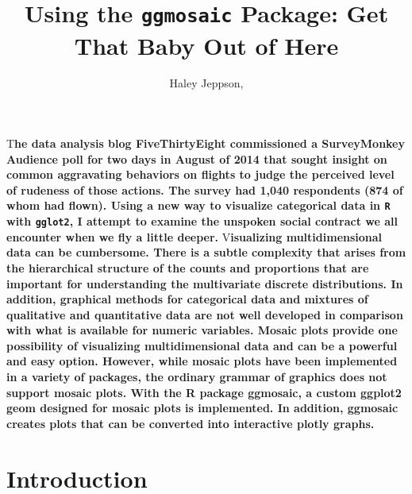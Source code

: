 \documentclass[DIV=calc, paper=a4, fontsize=10pt, twocolumn]{scrartcl}	 %
\title{Using the \texttt{ggmosaic} Package: Get That Baby Out of Here} %
\author{Haley Jeppson, } %
\date{} %
\newcommand{\initial}[1]{ %
\lettrine[lines=3,lhang=0.3,nindent=0em]{
\color{black}
{\textsf{#1}}}{}}
\begin{document}


\maketitle %

\thispagestyle{fancy} %


\vspace{-1cm}
\initial{T}\textbf{he data analysis blog FiveThirtyEight commissioned a SurveyMonkey Audience poll for two days in August of 2014 that sought insight on common aggravating behaviors on flights to judge the perceived level of rudeness of those actions. The survey had 1,040 respondents (874 of whom had flown). Using a new way to visualize categorical data in \texttt{R} with \texttt{gglot2}, I attempt to examine the unspoken social contract we all encounter when we fly a little deeper.}
\initial{V}\textbf{isualizing multidimensional data can be cumbersome. There is a subtle complexity that arises from the hierarchical structure of the counts and proportions that are important for understanding the multivariate discrete distributions. In addition, graphical methods for categorical data and mixtures of qualitative and quantitative data are not well developed in comparison with what is available for numeric variables. Mosaic plots provide one possibility of visualizing multidimensional data and can be a powerful and easy option. However, while mosaic plots have been implemented in a variety of packages, the ordinary grammar of graphics does not support mosaic plots. With the R package ggmosaic, a custom ggplot2 geom designed for mosaic plots is implemented. In addition, ggmosaic creates plots that can be converted into interactive plotly graphs.}



\section*{Introduction}
\end{document}
